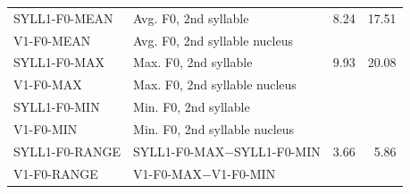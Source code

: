 \begin{table}[h!]
{\begin{subtable}[h]{\textwidth}
\begin{tabularx}{\textwidth}{p{}Xrr}
		SYLL1-F0-MEAN	& Avg. F0, 2nd syllable						& 8.24		& 17.51\\
		V1-F0-MEAN		& Avg. F0, 2nd syllable	nucleus				& \color{red}{TD}		& \color{red}{TD}\\
		SYLL1-F0-MAX		& Max. F0, 2nd syllable						& 9.93		& 20.08\\
		V1-F0-MAX		& Max. F0, 2nd syllable	nucleus				& \color{red}{TD}		& \color{red}{TD}\\
		SYLL1-F0-MIN		& Min. F0, 2nd syllable			& \color{red}{TD}	& \color{red}{TD}\\
		V1-F0-MIN		& Min. F0, 2nd syllable 	nucleus				& \color{red}{TD}		& \color{red}{TD}\\
		SYLL1-F0-RANGE	& SYLL1-F0-MAX$-$SYLL1-F0-MIN 	& 3.66		& 5.86 \\
		V1-F0-RANGE		& V1-F0-MAX$-$V1-F0-MIN				& \color{red}{TD}		& \color{red}{TD}\\
		
		\bottomrule
		\end{tabularx}
		\end{subtable}
		}
		\label{tab:f0features}
		\end{table}
		
